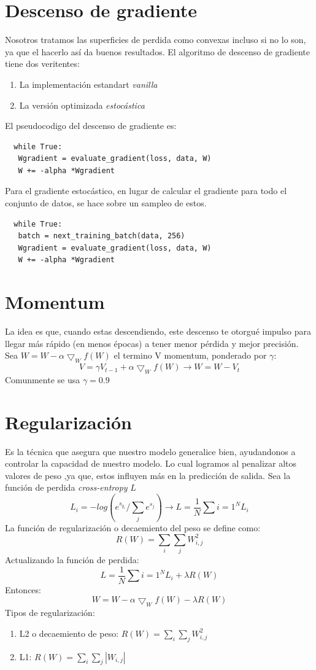 \documentclass{article}
\begin{document}
\section{Descenso de gradiente}
Nosotros tratamos las superficies de perdida como convexas incluso si no lo son, ya que el hacerlo así 
da buenos resultados. El algoritmo de descenso de gradiente tiene dos veritentes:
\begin{enumerate}
    \item La implementación estandart \textit{vanilla}
    \item La versión optimizada \textit{estocástica}
\end{enumerate}
El pseudocodigo del descenso de gradiente es:
 \begin{lstlisting}
  while True:
   Wgradient = evaluate_gradient(loss, data, W)
   W += -alpha *Wgradient
 \end{lstlisting}
Para el gradiente estocástico, en lugar de calcular el gradiente para todo el conjunto de datos, se hace sobre un sampleo de estos. 
 \begin{lstlisting}
  while True:
   batch = next_training_batch(data, 256)
   Wgradient = evaluate_gradient(loss, data, W)
   W += -alpha *Wgradient
 \end{lstlisting}
\section{Momentum}
La idea es que, cuando estas descendiendo, este descenso te otorgué impulso para llegar más rápido (en menos épocas) 
a tener menor pérdida y mejor precisión. Sea $W = W - \alpha \bigtriangledown_{W} f(W)$ el termino V momentum, 
ponderado por $\gamma$: 
\[
  V = \gamma V_{t-1} + \alpha \bigtriangledown_{W} f(W)  \longrightarrow W = W - V_t
\]
Comunmente se usa $\gamma = 0.9$
\section{Regularización}
Es la técnica que asegura que nuestro modelo generalice bien, 
ayudandonos a controlar la capacidad de nuestro modelo. Lo cual logramos al penalizar altos valores de peso
,ya que, estos influyen más en la predicción de salida. Sea la función de perdida \textit{cross-entropy} $L$
\[
L_i = -log(e^{s_{y_i}}/ \sum_je^{s_j}) \longrightarrow L = \frac{1}{N}\sum{i=1}^N L_i
\]
La función de regularización o decaemiento del peso se define como: 
\[
R(W) = \sum_i \sum_j W_{i,j}^2
\]
Actualizando la función de perdida: 
\[
L = \frac{1}{N}\sum{i=1}^N L_i + \lambda R(W)
\]
Entonces: 
\[
W = W - \alpha \bigtriangledown_W f(W) -\lambda R(W)
\]
Tipos de regularización:
\begin{enumerate}
    \item L2 o decaemiento de peso: $R(W)= \sum_i \sum_j W_{i,j}^2$
    \item L1: $R(W)= \sum_i \sum_j |W_{i,j}|$
\end{enumerate}
\end{document}
